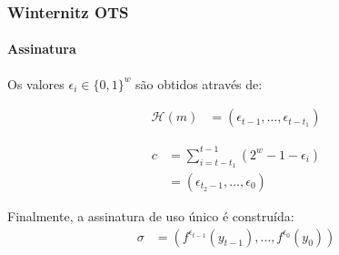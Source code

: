 \documentclass[12pt]{beamer}
\newcommand{\binwds}[1]{\{0, 1\}^{#1}}
\begin{document}
\begin{frame}
  \frametitle{Winternitz OTS}
  \framesubtitle{Assinatura}
  Os valores $\epsilon_i \in \binwds{w}$ são obtidos através de:

  \begin{minipage}{.45\linewidth}
    \begin{align*}
      \mathcal{H}(m) &= (\epsilon_{t - 1}, \dots, \epsilon_{t - t_1})
    \end{align*}
  \end{minipage}
  \begin{minipage}{.45\linewidth}
    \begin{align*}
      c &= \sum_{i = t - t_1}^{t - 1} (2^w - 1 - \epsilon_i) \\
        &= (\epsilon_{t_2 - 1}, \dots, \epsilon_{0})
    \end{align*}
  \end{minipage}
  \vspace{4mm}

  Finalmente, a assinatura de uso único é construída:
  \begin{align*}
    \sigma &= (f^{\epsilon_{t - 1}}(y_{t - 1}), \dots, f^{\epsilon_0}(y_0))
  \end{align*}
\end{frame}
\end{document}
